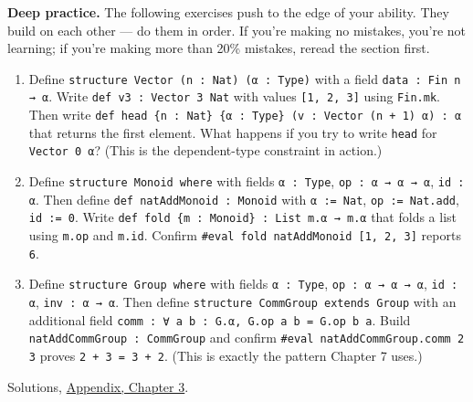 \textbf{Deep practice.} The following exercises push to the edge of your ability. They build on each other --- do them in order. If you're making no mistakes, you're not learning; if you're making more than 20\% mistakes, reread the section first.

\begin{enumerate}
\def\labelenumi{\arabic{enumi}.}
\setcounter{enumi}{6}
\tightlist
\item
  Define \texttt{structure Vector (n : Nat) (α : Type)} with a field \texttt{data : Fin n → α}. Write \texttt{def v3 : Vector 3 Nat} with values \texttt{[1, 2, 3]} using \texttt{Fin.mk}. Then write \texttt{def head \{n : Nat\} \{α : Type\} (v : Vector (n + 1) α) : α} that returns the first element. What happens if you try to write \texttt{head} for \texttt{Vector 0 α}? (This is the dependent-type constraint in action.)
\item
  Define \texttt{structure Monoid where} with fields \texttt{α : Type}, \texttt{op : α → α → α}, \texttt{id : α}. Then define \texttt{def natAddMonoid : Monoid} with \texttt{α := Nat}, \texttt{op := Nat.add}, \texttt{id := 0}. Write \texttt{def fold \{m : Monoid\} : List m.α → m.α} that folds a list using \texttt{m.op} and \texttt{m.id}. Confirm \texttt{\#eval fold natAddMonoid [1, 2, 3]} reports \texttt{6}.
\item
  Define \texttt{structure Group where} with fields \texttt{α : Type}, \texttt{op : α → α → α}, \texttt{id : α}, \texttt{inv : α → α}. Then define \texttt{structure CommGroup extends Group} with an additional field \texttt{comm : ∀ a b : G.α, G.op a b = G.op b a}. Build \texttt{natAddCommGroup : CommGroup} and confirm \texttt{\#eval natAddCommGroup.comm 2 3} proves \texttt{2 + 3 = 3 + 2}. (This is exactly the pattern Chapter 7 uses.)
\end{enumerate}

Solutions, \hyperref[sec:15-appendix-solutions:03-chapter-3:1]{Appendix, Chapter 3}.
